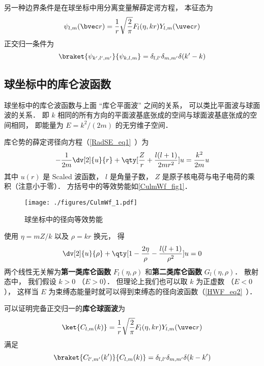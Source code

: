 另一种边界条件是在球坐标中用分离变量解薛定谔方程， 本征态为
\begin{equation}
\psi_{l,m}(\bvec r) = \frac{1}{r} \sqrt{\frac{2}{\pi}} F_l(\eta, kr) Y_{l,m}(\uvec r)
\end{equation}
正交归一条件为
\begin{equation}
\braket{\psi_{k', l',m'}}{\psi_{k, l,m}} = \delta_{l,l'}\delta_{m,m'} \delta(k'-k)
\end{equation}

\subsection{球坐标中的库仑波函数}
球坐标中的库仑波函数与上面 “库仑平面波” 之间的关系， 可以类比平面波与球面波的关系． 即 $k$ 相同的所有方向的平面波基底张成的空间与球面波基底张成的空间相同， 即能量为 $E = k^2/(2m)$ 的无穷维子空间．

库仑势的薛定谔径向方程（\autoref{RadSE_eq1}~）为
\begin{equation}\label{CulmWf_eq5}
-\frac{1}{2m} \dv[2]{u}{r} + \qty[\frac{Z}{r} + \frac{l(l+1)}{2mr^2}]u = \frac{k^2}{2m}u
\end{equation}
其中 $u(r)$ 是 Scaled 波函数， $l$ 是角量子数， $Z$ 是原子核电荷与电子电荷的乘积（注意小于零）． 方括号中的等效势能如\autoref{CulmWf_fig1}．
\begin{figure}[ht]
\centering
\texttt{[image: ./figures/CulmWf\_1.pdf]}
\caption{球坐标中的径向等效势能} \label{CulmWf_fig1}
\end{figure}

使用 $\eta = mZ/k$ 以及 $\rho = kr$ 换元， 得
\begin{equation}
\dv[2]{u}{\rho} + \qty[1 - \frac{2\eta}{\rho} - \frac{l(l+1)}{\rho^2}]u = 0
\end{equation}
两个线性无关解为\textbf{第一类库仑函数} $F_l(\eta, \rho)$ 和\textbf{第二类库仑函数} $G_l(\eta, \rho)$． 散射态中， 我们假设 $k > 0$ （$E > 0$）． 但理论上我们也可以取 $k$ 为正虚数 （$E < 0$）， 这样当 $E$ 为束缚态能量时就可以得到束缚态的径向波函数（\autoref{HWF_eq2}~）．

可以证明完备正交归一的\textbf{库仑球面波}为
\begin{equation}\label{CulmWf_eq1}
\ket{C_{l,m}(k)} = \frac{1}{r} \sqrt{\frac{2}{\pi}} F_l(\eta, kr) Y_{l,m}(\uvec r)
\end{equation}
满足
\begin{equation}\label{CulmWf_eq2}
\braket{C_{l',m'}(k')}{C_{l,m}(k)} = \delta_{l,l'}\delta_{m,m'}\delta(k-k')
\end{equation}

